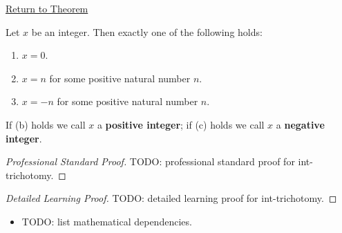 \newpage
{}
\label{prf:int-trichotomy}

\begin{remark*}[Return]
\hyperref[lem:int-trichotomy]{Return to Theorem}
\end{remark*}

\begin{lemma*}
Let $x$ be an integer. Then exactly one of the following holds:
\begin{enumerate}
  \item[(a)] $x = 0$.
  \item[(b)] $x = n$ for some positive natural number $n$.
  \item[(c)] $x = -n$ for some positive natural number $n$.
\end{enumerate}
If (b) holds we call $x$ a \textbf{positive integer};
if (c) holds we call $x$ a \textbf{negative integer}.
\end{lemma*}

\begin{proof}[Professional Standard Proof]
\LRAProofBodyStart
TODO: professional standard proof for int-trichotomy.
\end{proof}

\begin{proof}[Detailed Learning Proof]
\LRAProofBodyStart
TODO: detailed learning proof for int-trichotomy.
\end{proof}

\begin{remark*}
\end{remark*}

\begin{dependencies}
\begin{itemize}
  \item TODO: list mathematical dependencies.
\end{itemize}
\end{dependencies}

\clearpage
